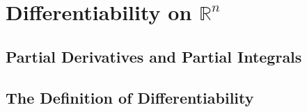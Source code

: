 \documentclass{report}
\begin{document}

\setcounter{chapter}{10}
\chapter{Differentiability on $\mathbb{R}^n$}
\thispagestyle{empty}
\newpage

\section{Partial Derivatives and Partial Integrals}

\setcounter{Exercise}{1}


\vspace{12pt}

\setcounter{Exercise}{3}


\vspace{12pt}




\section{The Definition of Differentiability}

\setcounter{Exercise}{1}


\vspace{12pt}



\vspace{12pt}



\vspace{12pt}



\vspace{12pt}



\vspace{12pt}

\setcounter{Exercise}{7}


\vspace{12pt}



\vspace{12pt}
\end{document}

